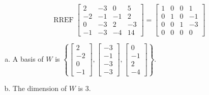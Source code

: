 \begin{exerciseAnswer} 


\[\operatorname{RREF} \left[\begin{array}{cccc}
2 & -3 & 0 & 5 \\
-2 & -1 & -1 & 2 \\
0 & -3 & 2 & -3 \\
-1 & -3 & -4 & 14
\end{array}\right] = \left[\begin{array}{cccc}
1 & 0 & 0 & 1 \\
0 & 1 & 0 & -1 \\
0 & 0 & 1 & -3 \\
0 & 0 & 0 & 0
\end{array}\right] \]


\begin{enumerate}[(a)]
\item A basis of \(W\) is \( \left\{ \left[\begin{array}{c}
2 \\
-2 \\
0 \\
-1
\end{array}\right] , \left[\begin{array}{c}
-3 \\
-1 \\
-3 \\
-3
\end{array}\right] , \left[\begin{array}{c}
0 \\
-1 \\
2 \\
-4
\end{array}\right] \right\} \).
\item The dimension of \(W\) is \( 3 \).
\end{enumerate}
    
\end{exerciseAnswer}
    
